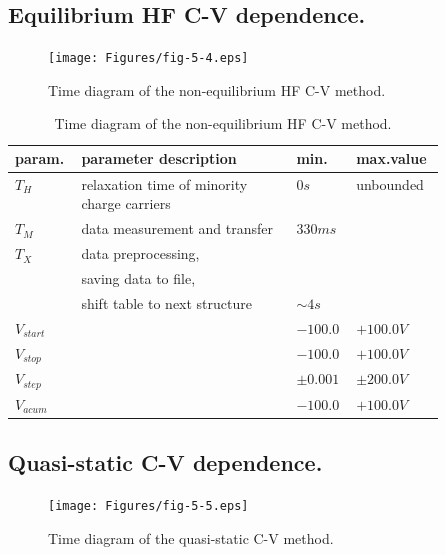 \subsection{Equilibrium HF C-V dependence.}\label{sec:5.4.2}

\begin{figure}[h!]\centering
  \texttt{[image: Figures/fig-5-4.eps]}
  \caption[Time diagram of non-equilibrium HF C-V method]{Time diagram
    of the non-equilibrium HF C-V method.}\label{fig:5.4}
\end{figure}

\begin{table}[h!]\centering
  \begin{tabular}{l p{0.5\linewidth} l l}
    param.      & parameter description & min. & max.value\\
    \hline
    $T_H$       & relaxation time of minority charge carriers \dotfill & $0 s$ & unbounded\\
    $T_M$       & data measurement and transfer \dotfill & $330 ms$\\
    $T_X$       & data preprocessing,\\
                & saving data to file,\\
                & shift table to next structure \dotfill & $\sim 4s$\\
    $V_{start}$ & \dotfill & $-100.0$ & $+100.0 V$\\
    $V_{stop}$  & \dotfill & $-100.0$ & $+100.0 V$\\
    $V_{step}$  & \dotfill & $\pm 0.001$ & $\pm 200.0 V$\\
    $V_{acum}$  & \dotfill & $-100.0$ & $+100.0 V$\\
    \hline
  \end{tabular}
  \caption[Time diagram of non-equilibrium HF C-V method]{Time diagram
    of the non-equilibrium HF C-V method.}\label{tab:5.2}
\end{table}

\newpage
\subsection{Quasi-static C-V dependence.}\label{sec:5.4.3}

\begin{figure}[h!]\centering
  \texttt{[image: Figures/fig-5-5.eps]}
  \caption[Time diagram of the quasi-static C-V method]{Time diagram
    of the quasi-static C-V method.}\label{fig:5.5}
\end{figure}

